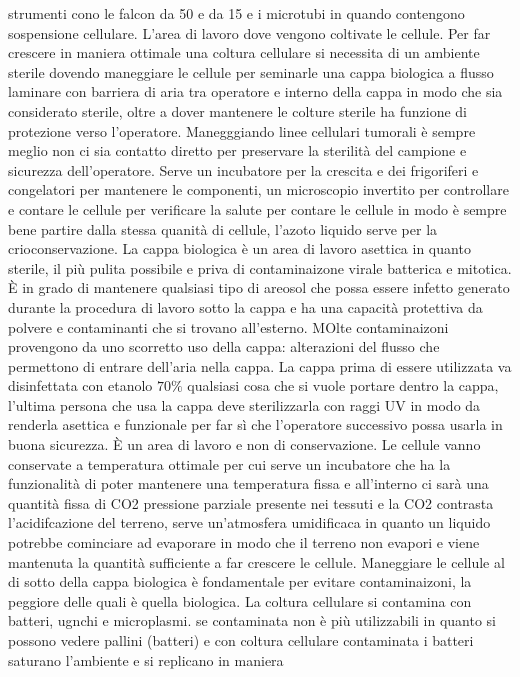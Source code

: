 strumenti cono le falcon da 50 e da 15 e i microtubi in quando contengono sospensione cellulare. L'area di lavoro dove vengono coltivate le cellule. Per far crescere in maniera ottimale 
una coltura cellulare si necessita di un ambiente sterile dovendo maneggiare le cellule per seminarle una cappa biologica a flusso laminare con barriera di aria tra operatore e interno
della cappa in modo che sia considerato sterile, oltre a dover mantenere le colture sterile ha funzione di protezione verso l'operatore. Manegggiando linee cellulari tumorali \`e sempre
meglio non ci sia contatto diretto per preservare la sterilit\`a del campione e sicurezza dell'operatore. Serve un incubatore per la crescita e dei frigoriferi e congelatori per
mantenere le componenti, un microscopio invertito per controllare e contare le cellule per verificare la salute per contare le cellule in modo \`e sempre bene partire dalla stessa 
quanit\`a di cellule, l'azoto liquido serve per la crioconservazione. La cappa biologica \`e un area di lavoro asettica in quanto sterile, il pi\`u pulita possibile e priva di 
contaminaizone virale batterica e mitotica. \`E in grado di mantenere qualsiasi tipo di areosol che possa essere infetto generato durante la procedura di lavoro sotto la cappa e ha una
capacit\`a protettiva da polvere e contaminanti che si trovano all'esterno. MOlte contaminaizoni provengono da uno scorretto uso della cappa: alterazioni del flusso che permettono di 
entrare dell'aria nella cappa. La cappa prima di essere utilizzata va disinfettata con etanolo $70\%$ qualsiasi cosa che si vuole portare dentro la cappa, l'ultima persona che usa la
cappa deve sterilizzarla con raggi UV in modo da renderla asettica e funzionale per far s\`i che l'operatore successivo possa usarla in buona sicurezza. \`E un area di lavoro e non
di conservazione. Le cellule vanno conservate a temperatura ottimale per cui serve un incubatore che ha la funzionalit\`a di poter mantenere una temperatura fissa e 
all'interno ci sar\`a una quantit\`a fissa di CO2 pressione parziale presente nei tessuti e la CO2 contrasta l'acidifcazione del terreno, serve un'atmosfera umidificaca in quanto un
liquido potrebbe cominciare ad evaporare in modo che il terreno non evapori e viene mantenuta la quantit\`a sufficiente a far crescere le cellule. Maneggiare le cellule al di sotto della
cappa biologica \`e fondamentale per evitare contaminaizoni, la peggiore delle quali \`e quella biologica.  La coltura cellulare si contamina con batteri, ugnchi e microplasmi. se 
contaminata non \`e pi\`u utilizzabili in quanto si possono vedere pallini (batteri) e con coltura cellulare contaminata i batteri saturano l'ambiente e si replicano in maniera 
